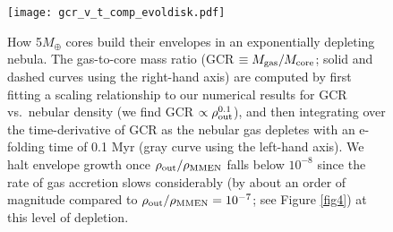 \documentclass[fleqn,useAMS,usenatbib]{mnras}
\begin{document}
\begin{figure}
    \centering
    \texttt{[image: gcr\_v\_t\_comp\_evoldisk.pdf]}
    \caption{How 5$M_\oplus$ cores build their envelopes in an
        exponentially depleting nebula. The gas-to-core mass ratio
        (GCR $\equiv M_{\rm gas}/M_{\rm core}$; solid and dashed
        curves using the right-hand axis) are computed by first
        fitting a scaling relationship to our numerical results for
        GCR vs.~nebular density (we find GCR $\propto \rho_{\rm out}^{0.1}$),
        and then integrating over the time-derivative of GCR as the
        nebular gas depletes with an e-folding time of 0.1 Myr (gray
        curve using the left-hand axis). 
        We halt envelope growth once 
        $\rho_{\rm out}/\rho_{\rm MMEN}$ falls below $10^{-8}$ since the rate of gas
        accretion slows considerably 
        (by about an order of magnitude compared to $\rho_{\rm
            out}/\rho_{\rm MMEN} = 10^{-7}$; see Figure \ref{fig4})
        at this level of depletion.}
    \label{fig:gcr_v_t_evoldisk}
\end{figure}
\end{document}
